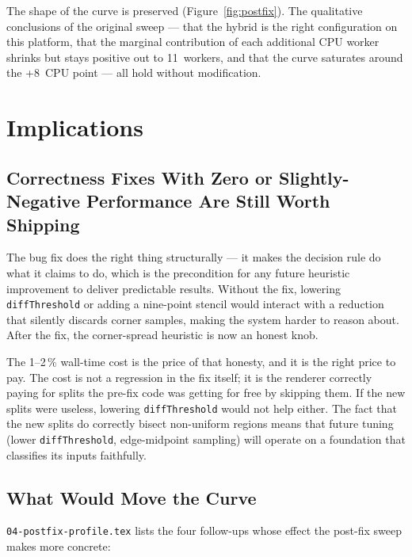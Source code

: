\documentclass[
	english,
	letterpaper, oneside
]{article}
\begin{document}
\noindent
The shape of the curve is preserved (Figure~\ref{fig:postfix}). The
qualitative conclusions of the original sweep --- that the hybrid is
the right configuration on this platform, that the marginal
contribution of each additional CPU worker shrinks but stays positive
out to 11~workers, and that the curve saturates around the +8~CPU
point --- all hold without modification.

\section{Implications}

\subsection{Correctness Fixes With Zero or Slightly-Negative Performance Are Still Worth Shipping}

The bug fix does the right thing structurally --- it makes the
decision rule do what it claims to do, which is the precondition
for any future heuristic improvement to deliver predictable results.
Without the fix, lowering \texttt{diffThreshold} or adding a
nine-point stencil would interact with a reduction that silently
discards corner samples, making the system harder to reason about.
After the fix, the corner-spread heuristic is now an honest knob.

The 1--2\,\% wall-time cost is the price of that honesty, and it is the
right price to pay. The cost is not a regression in the fix
itself; it is the renderer correctly paying for splits the
pre-fix code was getting for free by skipping them. If the new splits
were useless, lowering \texttt{diffThreshold} would not help either.
The fact that the new splits do correctly bisect non-uniform regions
means that future tuning (lower \texttt{diffThreshold}, edge-midpoint
sampling) will operate on a foundation that classifies its inputs
faithfully.

\subsection{What Would Move the Curve}

\texttt{04-postfix-profile.tex} lists the four follow-ups whose effect
the post-fix sweep makes more concrete:
\end{document}

